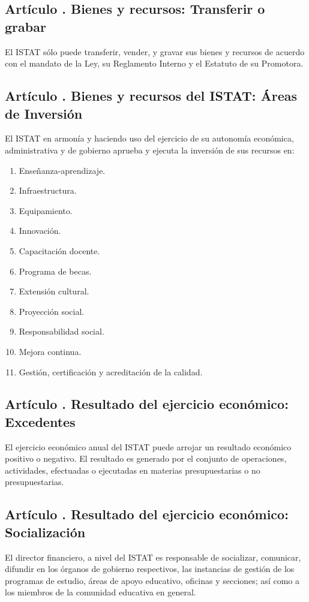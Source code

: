 \subsection{Artículo . Bienes y recursos:  Transferir o grabar}
\addtocounter{ns}{1}
El ISTAT sólo puede transferir, vender, y gravar sus bienes y recursos de acuerdo con el mandato de la Ley, su Reglamento Interno y el Estatuto de su Promotora.  
\subsection{Artículo . Bienes y recursos del ISTAT: Áreas de Inversión}
\addtocounter{ns}{1}
El ISTAT en armonía y haciendo uso del ejercicio de su autonomía económica, administrativa y de gobierno aprueba y ejecuta la inversión de sus recursos en: 
\begin{enumerate}
\item Enseñanza-aprendizaje. 
\item Infraestructura. 
\item Equipamiento. 
\item Innovación. 
\item Capacitación docente. 
\item Programa de becas. 
\item Extensión cultural. 
\item Proyección social. 
\item Responsabilidad social. 
\item Mejora continua. 
\item Gestión, certificación y acreditación de la calidad. 
\end{enumerate}
\subsection{Artículo . Resultado del ejercicio económico: Excedentes}
\addtocounter{ns}{1}
El ejercicio económico anual del ISTAT puede arrojar un resultado económico positivo o negativo. El resultado es generado por el conjunto de operaciones, actividades, efectuadas o ejecutadas en materias presupuestarias o no presupuestarias. 
\subsection{Artículo . Resultado del ejercicio económico: Socialización}
\addtocounter{ns}{1}
El director financiero, a nivel del ISTAT es responsable de socializar, comunicar, difundir en los órganos de gobierno respectivos, las instancias de gestión de los programas de estudio, áreas de apoyo educativo, oficinas y secciones; así como a los miembros de la comunidad educativa en general. 
